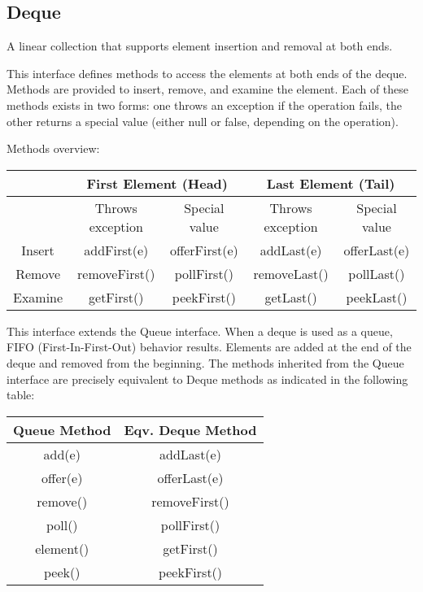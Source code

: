 \documentclass{scrartcl}
\begin{document}
\subsection{Deque}

    A linear collection that supports element insertion and removal at both ends.

    This interface defines methods to access the elements at both ends of the deque. Methods are provided to insert, remove, and examine the element. Each of these methods exists in two forms: one throws an exception if the operation fails, the other returns a special value (either null or false, depending on the operation).

    \bigskip

    Methods overview:

    \bigskip

    \begin{tabular}{|c|c|c|c|c|}
        \hline
        &  \multicolumn{2}{c}{First Element (Head)} & \multicolumn{2}{c}{Last Element (Tail)} \\
        \hline
        & Throws exception & Special value  & Throws exception & Special value  \\
        \hline
        Insert & addFirst(e) & offerFirst(e) & addLast(e) & offerLast(e) \\
        \hline
        Remove& removeFirst() & pollFirst() & removeLast() & pollLast() \\
        \hline
        Examine& getFirst() & peekFirst() & getLast() &  peekLast()\\
        \hline
    \end{tabular}

    \bigskip
    \bigskip

    This interface extends the Queue interface. When a deque is used as a queue, FIFO (First-In-First-Out) behavior results. Elements are added at the end of the deque and removed from the beginning. The methods inherited from the Queue interface are precisely equivalent to Deque methods as indicated in the following table:

    \bigskip

    \begin{tabular}{|c|c|}
        \hline
        Queue Method& Eqv. Deque Method \\
        \hline
        add(e) &	addLast(e)  \\
        \hline
        offer(e) &	offerLast(e)  \\
        \hline
        remove() & 	removeFirst() \\
        \hline
        poll() &	pollFirst()  \\
        \hline
        element() &	getFirst()  \\
        \hline
        peek() &	peekFirst()  \\
        \hline
    \end{tabular}
\end{document}
